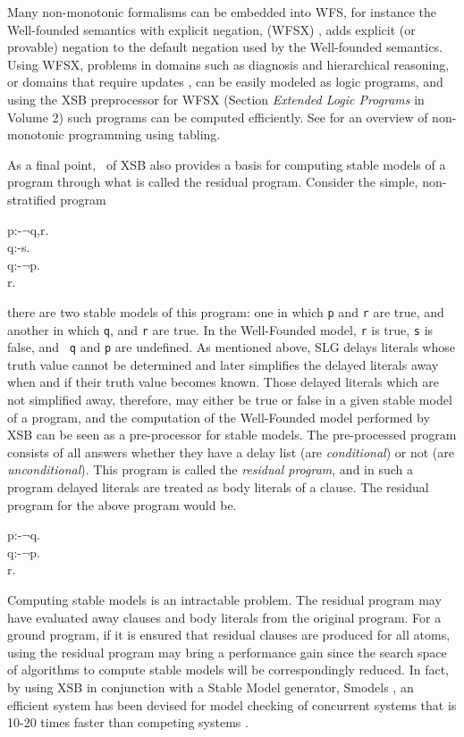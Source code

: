 Many non-monotonic formalisms can be embedded into WFS, for instance
the Well-founded semantics with explicit negation, (WFSX)
\cite{ADP95}, adds explicit (or provable) negation to the default
negation used by the Well-founded semantics.  Using WFSX, problems in
domains such as diagnosis and hierarchical reasoning, or domains that
require updates \cite{Leit97}, can be easily modeled as logic
programs, and using the XSB preprocessor for WFSX (Section {\it
Extended Logic Programs} in Volume 2) such programs can be computed
efficiently.  See \cite{Swif99a} for an overview of non-monotonic
programming using tabling.

As a final point, \version\ of XSB also provides a basis for computing
stable models of a program through what is called the residual
program. Consider the simple, non-stratified program 
\begin{center}
\begin{Prog}
p:-$\neg$q,r. \\
q:-s. \\
q:-$\neg$p. \\
r. \\
\end{Prog}
\end{center}
there are two stable models of this program: one in which {\tt p} and
{\tt r} are true, and another in which {\tt q}, and {\tt r} are true.
In the Well-Founded model, {\tt r} is true, {\tt s} is false, and {\tt
q} and {\tt p} are undefined.  As mentioned above, SLG delays literals
whose truth value cannot be determined and later simplifies the
delayed literals away when and if their truth value becomes known.
Those delayed literals which are not simplified away, therefore, may
either be true or false in a given stable model of a program, and the
computation of the Well-Founded model performed by XSB can be seen as
a pre-processor for stable models.  The pre-processed program consists
of all answers whether they have a delay list (are {\em conditional})
or not (are {\em unconditional}).  This program is called the {\em
residual program}, and in such a program delayed literals are treated
as body literals of a clause.  The residual program for the above
program would be. 
\begin{center}
\begin{Prog}
p:-$\neg$q. \\
q:-$\neg$p. \\
r. \\
\end{Prog}
\end{center}
Computing stable models is an intractable problem.  The residual
program may have evaluated away clauses and body literals from the
original program.  For a ground program, if it is ensured that
residual clauses are produced for all atoms, using the residual
program may bring a performance gain since the search space of
algorithms to compute stable models will be correspondingly reduced.
In fact, by using XSB in conjunction with a Stable Model generator,
Smodels \cite{NiSi96}, an efficient system has been devised for model
checking of concurrent systems that is 10-20 times faster than
competing systems \cite{RaSm97}.


